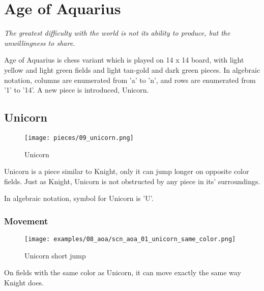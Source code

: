 
\chapter*{Age of Aquarius}

\begin{flushright}
\parbox{0.8\textwidth}{
\emph{The greatest difficulty with the world is not its ability to produce, but the unwillingness to share. \\
 } }
\end{flushright}

\noindent
Age of Aquarius is chess variant which is played on 14 x 14 board,
with light yellow and light green fields and light tan-gold and
dark green pieces. In algebraic notation, columns are enumerated
from 'a' to 'n', and rows are enumerated from '1' to '14'. A new
piece is introduced, Unicorn.

\clearpage %

\section*{Unicorn}

\noindent
\begin{wrapfigure}[7]{l}{0.4\textwidth}
\centering
\texttt{[image: pieces/09\_unicorn.png]}
\caption{Unicorn}
\label{fig:09_unicorn}
\end{wrapfigure}
Unicorn is a piece similar to Knight, only it can jump longer on
opposite color fields. Just as Knight, Unicorn is not obstructed
by any piece in its' surroundings.

In algebraic notation, symbol for Unicorn is 'U'.

\vspace{4\baselineskip}
\subsection*{Movement}

\noindent
\begin{wrapfigure}{l}{0.4\textwidth}
\centering
\texttt{[image: examples/08\_aoa/scn\_aoa\_01\_unicorn\_same\_color.png]}
\caption{Unicorn short jump}
\label{fig:scn_aoa_01_unicorn_same_color}
\end{wrapfigure}
On fields with the same color as Unicorn, it can move exactly the
same way Knight does.

